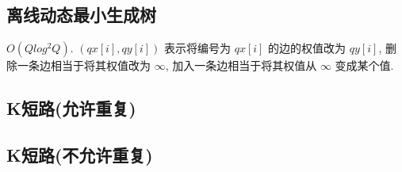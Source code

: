\documentclass[landscape, twocolumn, 8pt, a4paper, twoside]{extarticle}
\begin{document}
  \subsection{离线动态最小生成树}
    $O (Q log^2 Q) $.
    $(qx[i], qy[i])$ 表示将编号为 $qx[i]$ 的边的权值改为 $qy[i]$,
    删除一条边相当于将其权值改为 $\infty$,
    加入一条边相当于将其权值从 $\infty$ 变成某个值.
    

  \subsection{K短路(允许重复)}
    

  \subsection{K短路(不允许重复)}
    
  
\end{document}
